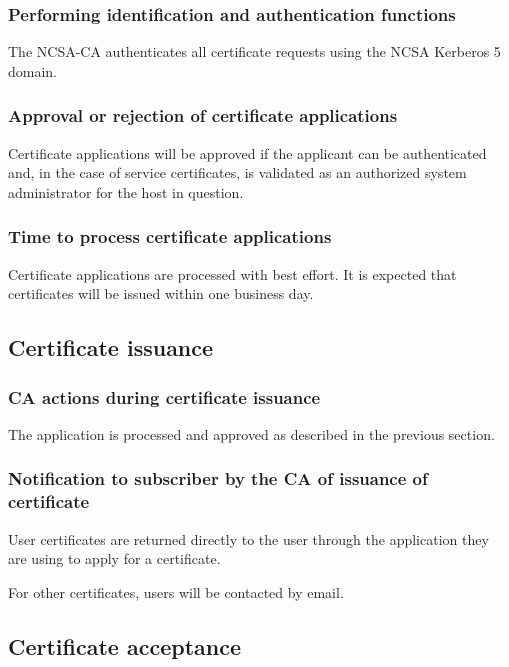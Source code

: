 \documentclass[10pt]{article}
\begin{document}
\subsubsection{Performing identification and authentication functions}

The NCSA-CA authenticates all certificate requests using the NCSA
Kerberos 5 domain.

\subsubsection{Approval or rejection of certificate applications}

Certificate applications will be approved if the applicant can be
authenticated and, in the case of service certificates, is validated
as an authorized system administrator for the host in question.

\subsubsection{Time to process certificate applications}

Certificate applications are processed with best effort. It is
expected that certificates will be issued within one business day.

\subsection{Certificate issuance}

\subsubsection{CA actions during certificate issuance}

The application is processed and approved as described in the previous
section.

\subsubsection{Notification to subscriber by the CA of issuance of certificate}

User certificates are returned directly to the user through the
application they are using to apply for a certificate.

For other certificates, users will be contacted by email.

\subsection{Certificate acceptance}
\end{document}
